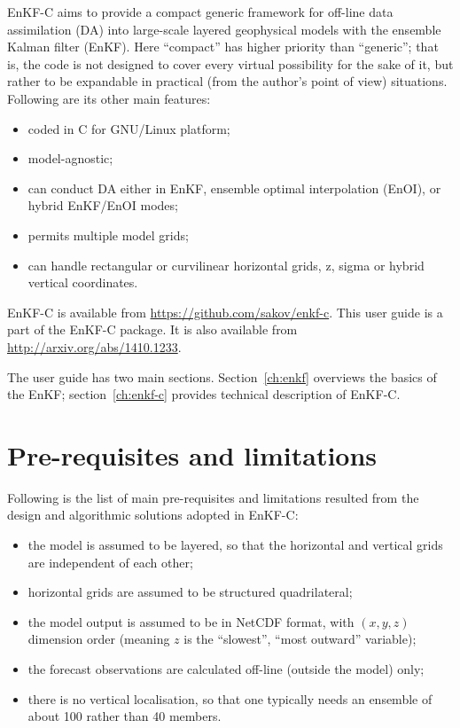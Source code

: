 \documentclass[11pt]{report}
\begin{document}
EnKF-C aims to provide a compact generic framework for off-line data assimilation (DA) into large-scale layered geophysical models with the ensemble Kalman filter (EnKF).
Here ``compact'' has higher priority than ``generic''; that is, the code is not designed to cover every virtual possibility for the sake of it, but rather to be expandable in practical (from the author's point of view) situations.
Following are its other main features:
\begin{itemize}
\item coded in C for GNU/Linux platform;
\item model-agnostic;
\item can conduct DA either in EnKF, ensemble optimal interpolation (EnOI), or hybrid EnKF/EnOI modes;
\item permits multiple model grids;
\item can handle rectangular or curvilinear horizontal grids, z, sigma or hybrid vertical coordinates.
\end{itemize}

EnKF-C is available from \url{https://github.com/sakov/enkf-c}.
This user guide is a part of the EnKF-C package. 
It is also available from \url{http://arxiv.org/abs/1410.1233}.

The user guide has two main sections.
Section~\ref{ch:enkf} overviews the basics of the EnKF; section~\ref{ch:enkf-c} provides technical description of EnKF-C.

\section*{Pre-requisites and limitations}

Following is the list of main pre-requisites and limitations resulted from the design and algorithmic solutions adopted in EnKF-C:
\begin{itemize}
\item the model is assumed to be layered, so that the horizontal and vertical grids are independent of each other;
\item horizontal grids are assumed to be structured quadrilateral;
\item the model output is assumed to be in NetCDF format, with $(x, y, z)$ dimension order (meaning $z$ is the ``slowest'', ``most outward'' variable);
\item the forecast observations are calculated off-line (outside the model) only;
\item there is no vertical localisation, so that one typically needs an ensemble of about 100 rather than 40 members.
\end{itemize}
\end{document}
